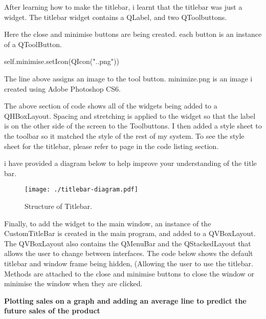 After learning how to make the titlebar, i learnt that the titlebar was just a widget. The titlebar widget contains a QLabel, and two QToolbuttons.


Here the close and minimise buttons are being created. each button is an instance of a QToolButton. 

\begin{python}
self.minimise.setIcon(QIcon(".\SystemImages\minimize.png"))
\end{python}

The line above assigns an image to the tool button. minimize.png is an image i created using Adobe Photoshop CS6.


The above section of code shows all of the widgets being added to a QHBoxLayout. Spacing and stretching is applied to the widget so that the label is on the other side of the screen to the Toolbuttons. I then added a style sheet to the toolbar so it matched the style of the rest of my system. To see the style sheet for the titlebar, please refer to page \pageref{fig:CustomToolbarClass} in the code listing section. \par

i have provided a diagram below to help improve your understanding of the title bar.



\begin{figure}[H]
    \texttt{[image: ./titlebar-diagram.pdf]}
    \caption{Structure of Titlebar.} \label{fig:titlebar-diagram}
\end{figure}

Finally, to add the widget to the main window, an instance of the CustomTitleBar is created in the main program, and added to a QVBoxLayout. The QVBoxLayout also contains the QMenuBar and the QStackedLayout that allows the user to change between interfaces. The code below shows the default titlebar and window frame being hidden, (Allowing the user to use the titlebar. Methods are attached to the close and minimise buttons to close the window or minimise the window when they are clicked.


\textbf{Plotting sales on a graph and adding an average line to predict the future sales of the product}

